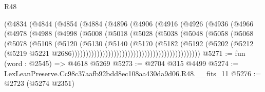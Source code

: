 \begin{lexlean}{R48}
\begin{coremodule}
                                  (@4834
                                    (@4844
                                      (@4854
                                        (@4884
                                          (@4896
                                            (@4906
                                              (@4916
                                                (@4926
                                                  (@4936
                                                    (@4966
                                                      (@4978
                                                        (@4988
                                                          (@4998
                                                            (@5008
                                                              (@5018
                                                                (@5028
                                                                  (@5038
                                                                    (@5048
                                                                      (@5058
                                                                        (@5068
                                                                          (@5078
                                                                            (@5108
                                                                              (@5120
                                                                                (@5130
                                                                                  (@5140
                                                                                    (@5170
                                                                                      (@5182
                                                                                        (@5192
                                                                                          (@5202
                                                                                            (@5212
                                                                                              (@5219
                                                                                                @5221
                                                                                                @2686))))))))))))))))))))))))))))))))))))))))))))))
@5271 := fun (word : @2545) => @4618 @5269
@5273 := @2704 @315 @4499
@5274 := LexLeanPreserve.Cc98c37aafb92bdd8ec108aa430da9d06.R48.__fits_11
@5276 := @2723 (@5274 @2351)

\end{coremodule}
\end{lexlean}
